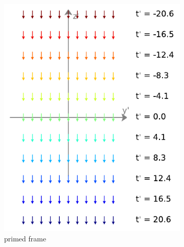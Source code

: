 \begin{figure}[H]
\begin{subfigure}{0.32\textwidth}
		\includegraphics[width=\textwidth]{images/pdf/coord_transform_primed.pdf}
		\caption{primed frame}
		\label{fig: coordinate transform subfig_2}
	\end{subfigure}
	\begin{subfigure}{0.29\textwidth}
		\centering

\end{subfigure}
\end{figure}
